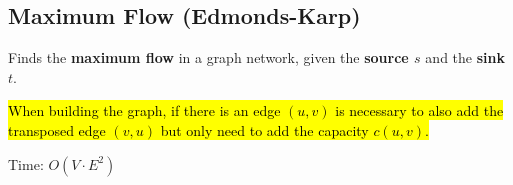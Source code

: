 \subsection{Maximum Flow (Edmonds-Karp)}

Finds the \textbf{maximum flow} in a graph network, given the \textbf{source $s$} and the \textbf{sink $t$}.

\hl{When building the graph, if there is an edge $(u, v)$ is necessary to also add the transposed edge $(v, u)$ but only need to add the capacity $c(u, v)$.}

Time: $O(V \cdot E^2)$
